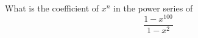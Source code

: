   What is the coefficient of $x^n$ in the power series of
  \[
    \frac{1 - x^{100}}{1 - x^2}
  \]

